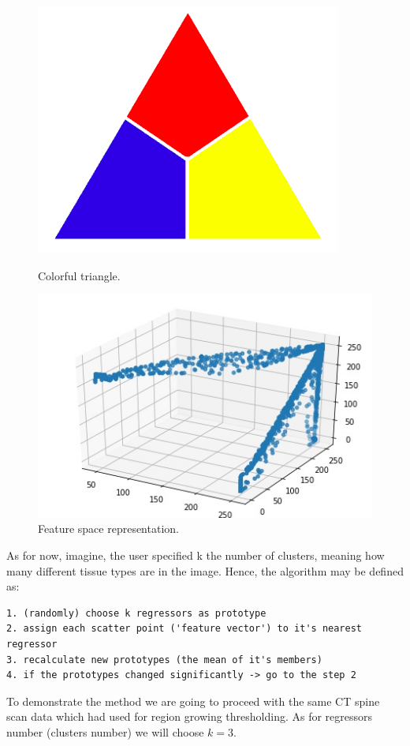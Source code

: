 \begin{figure}[h]
    \centering
    \begin{minipage}[b]{0.4\textwidth}
    \includegraphics[width=\textwidth]{images/k_mean_triangle.png}
    \caption{Colorful triangle.}
    \end{minipage}
    \hfill
    \begin{minipage}[b]{0.4\textwidth}
    \includegraphics[width=\textwidth]{images/k_mean_triangle_clustered.jpg}
    \caption{Feature space representation.}
    \end{minipage}
\end{figure}


As for now, imagine, the user specified k the number of clusters, meaning how many different tissue types are in the image.
Hence, the algorithm may be defined as:
\begin{lstlisting}
1. (randomly) choose k regressors as prototype
2. assign each scatter point ('feature vector') to it's nearest regressor
3. recalculate new prototypes (the mean of it's members)
4. if the prototypes changed significantly -> go to the step 2 
\end{lstlisting}
To demonstrate the method we are going to proceed with the same CT spine scan data which had used for region growing thresholding. As for regressors number (clusters number) we will choose $k=3$.  

